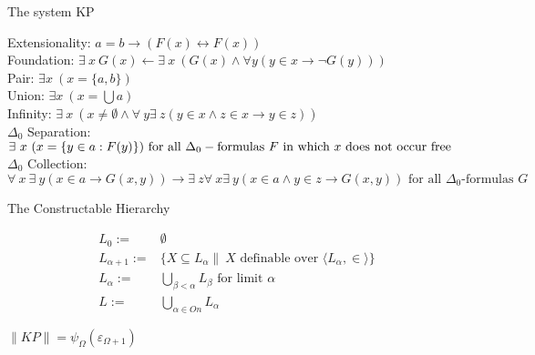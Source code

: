 \documentclass{beamer}
\begin{document}
\begin{frame}{The system KP}
\begin{minipage}{\textwidth}

   Extensionality: $a = b \rightarrow (F(x) \leftrightarrow F(x))$ \\
   
   Foundation: $\exists\ x\ G(x) \leftarrow \exists\ x\ (G(x) \wedge \forall y (y \in x \rightarrow  \neg G(y) ))$ \\
   
 
  Pair: $\exists x\ (x = \{a, b \})$\\
  
  Union: $\exists x\ (x = \bigcup a)$\\
  
 Infinity: $\exists\ x\ (x \not = \emptyset \wedge \forall\ y \exists\ z (y \in x \wedge z \in x \rightarrow y \in z))$\\
  
 $\Delta_0$ Separation: $\exists\ x\ ( x = \{y \in a : F(y) \}) \text{ for all } \Delta_0-\text{formulas }  F  \\ \text{ in which }x\text{ does not occur free}$\\

$\Delta_0$ Collection: $\forall\ x\ \exists\ y (x \in a \rightarrow G(x, y)) \rightarrow \exists\ z \forall\ x \exists\ y (x \in a \wedge y \in z \rightarrow G (x, y)) \text{ for all } \Delta_0 \text{-formulas } G$

 \end{minipage}
\end{frame}


\begin{frame}{The Constructable Hierarchy}
\begin{minipage}{\textwidth}
	\begin{align*}
		L_0 :=  &\emptyset\\
     L_{\alpha +1} := & \{X \subseteq L_{\alpha} \|\ X \text{ definable over } \langle L_\alpha, \in \rangle \} \\
     L_{\alpha} := & \bigcup_{\beta < \alpha}  L_{\beta} \text{ for limit }\alpha\\
   L := & \bigcup_{\alpha \in On} L_{\alpha}
	\end{align*} 
	 \end{minipage}\pause\newline\newline
	 
 \begin{minipage}{\textwidth}
		$\| KP \| = \psi_{\Omega}(\varepsilon_{\Omega+1})$
\end{minipage}


\end{frame}
\end{document}
